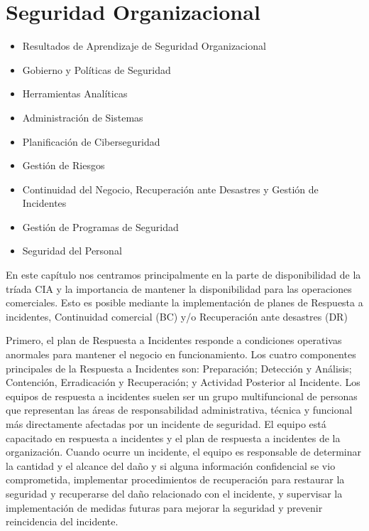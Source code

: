 \section{Seguridad Organizacional}
\color{blue}
\begin{itemize}
  \item Resultados de Aprendizaje de Seguridad Organizacional

  \item Gobierno y Políticas de Seguridad
  \item Herramientas Analíticas
  \item Administración de Sistemas
  \item Planificación de Ciberseguridad
   \item Gestión de Riesgos
   \item Continuidad del Negocio, Recuperación ante Desastres y Gestión de Incidentes
  \item Gestión de Programas de Seguridad
  \item Seguridad del Personal
\end{itemize}
\color{black}
En este capítulo nos centramos principalmente en la parte de disponibilidad de la tríada CIA y la importancia de mantener la disponibilidad para las operaciones comerciales. Esto es posible mediante la implementación de planes de Respuesta a incidentes, Continuidad comercial (BC) y/o Recuperación ante desastres (DR)

Primero, el plan de Respuesta a Incidentes responde a condiciones operativas anormales para mantener el negocio en funcionamiento. Los cuatro componentes principales de la Respuesta a Incidentes son: Preparación; Detección y Análisis; Contención, Erradicación y Recuperación; y Actividad Posterior al Incidente. Los equipos de respuesta a incidentes suelen ser un grupo multifuncional de personas que representan las áreas de responsabilidad administrativa, técnica y funcional más directamente afectadas por un incidente de seguridad. El equipo está capacitado en respuesta a incidentes y el plan de respuesta a incidentes de la organización. Cuando ocurre un incidente, el equipo es responsable de determinar la cantidad y el alcance del daño y si alguna información confidencial se vio comprometida, implementar procedimientos de recuperación para restaurar la seguridad y recuperarse del daño relacionado con el incidente, y supervisar la implementación de medidas futuras para mejorar la seguridad y prevenir reincidencia del incidente.

